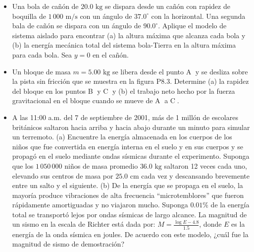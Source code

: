 \documentclass[11pt,a4paper]{article}
\begin{document}
\begin{itemize}
    \item[\textbf{2.}] Una bola de cañón de $20.0 \text{ kg}$ se dispara desde un cañón con rapidez de boquilla de $1\,000 \text{ m/s}$ con un ángulo de $37.0^\circ$ con la horizontal. Una segunda bala de cañón se dispara con un ángulo de $90.0^\circ$. Aplique el modelo de sistema aislado para encontrar (a) la altura máxima que alcanza cada bola y (b) la energía mecánica total del sistema bola-Tierra en la altura máxima para cada bola. Sea $y = 0$ en el cañón.
    \vspace*{6cm}

    \item[\textbf{3.}] Un bloque de masa $m = 5.00 \text{ kg}$ se libera desde el punto \textcircled{A} y se desliza sobre la pista sin fricción que se muestra en la figura P8.3. Determine (a) la rapidez del bloque en los puntos \textcircled{B} y \textcircled{C} y (b) el trabajo neto hecho por la fuerza gravitacional en el bloque cuando se mueve de \textcircled{A} a \textcircled{C}.
    \vspace*{6cm}

    \item[\textbf{4.}] A las 11:00 a.m. del 7 de septiembre de 2001, más de 1 millón de escolares británicos saltaron hacia arriba y hacia abajo durante un minuto para simular un terremoto. (a) Encuentre la energía almacenada en los cuerpos de los niños que fue convertida en energía interna en el suelo y en sus cuerpos y se propagó en el suelo mediante ondas sísmicas durante el experimento. Suponga que los $1\,050\,000$ niños de masa promedio $36.0 \text{ kg}$ saltaron 12 veces cada uno, elevando sus centros de masa por $25.0 \text{ cm}$ cada vez y descansando brevemente entre un salto y el siguiente. (b) De la energía que se propaga en el suelo, la mayoría produce vibraciones de alta frecuencia ``microtemblores'' que fueron rápidamente amortiguadas y no viajaron mucho. Suponga $0.01\%$ de la energía total se transportó lejos por ondas sísmicas de largo alcance. La magnitud de un sismo en la escala de Richter está dada por: $M = \frac{\log E - 4.8}{1.5}$, donde $E$ es la energía de la onda sísmica en joules. De acuerdo con este modelo, ¿cuál fue la magnitud de sismo de demostración?
    \vspace*{6cm}
\end{itemize}

\newpage
\end{document}
